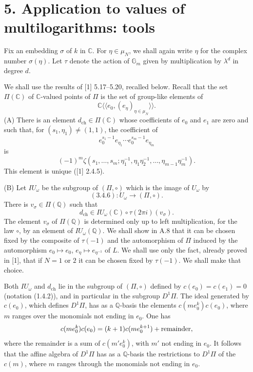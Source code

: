 \documentclass[10pt,a4paper]{article}
\newcommand{\Gm}{\mathbb G_m}
\newcommand{\Q}{\mathbb Q}
\newcommand{\C}{\mathbb C}
\theoremstyle{deligne}
\newcommand{\heading}[1]{\vspace{0.65em}\noindent{\bfseries #1}\quad}
\begin{document}
\section*{5. Application to values of multilogarithms: tools}

Fix an embedding \(\sigma\) of \(k\) in \(\C\). For \(\eta\in\mu_N\), we shall again write \(\eta\) for the complex number \(\sigma(\eta)\). Let \(\tau\) denote the action of \(\Gm\) given by multiplication by \(\lambda^d\) in degree \(d\).

\heading{5.1.} We shall use the results of [1] 5.17--5.20, recalled below. Recall that the set \(\Pi(\C)\) of \(\C\)-valued points of \(\Pi\) is the set of group-like elements of
\[
 \C\langle\!\langle e_0,(e_\eta)_{\eta\in\mu_N}\rangle\!\rangle .
\]
(A) There is an element \(d_{\mathrm{ch}}\in\Pi(\C)\) whose coefficients of \(e_0\) and \(e_1\) are zero and such that, for \((s_1,\eta_1)\ne(1,1)\), the coefficient of
\[
 e_0^{s_1-1}e_{\eta_1}\cdots e_0^{s_m-1}e_{\eta_m}
\]
is
\[
 (-1)^m\zeta(s_1,\ldots,s_m;\eta_1^{-1},\eta_1\eta_2^{-1},\ldots,\eta_{m-1}\eta_m^{-1}).
\]
This element is unique ([1] 2.4.5).

(B) Let \(IU_\omega\) be the subgroup of \((\Pi,\circ)\) which is the image of \(U_\omega\) by
\[
(3.4.6):U_\omega\longrightarrow(\Pi,\circ).
\]
There is \(v_\sigma\in\Pi(\Q)\) such that
\[
\tag{5.1.1}
d_{\mathrm{ch}}\in IU_\omega(\C)\circ \tau(2\pi i)(v_\sigma).
\]
The element \(v_\sigma\) of \(\Pi(\Q)\) is determined only up to left multiplication, for the law \(\circ\), by an element of \(IU_\omega(\Q)\). We shall show in A.8 that it can be chosen fixed by the composite of \(\tau(-1)\) and the automorphism of \(\Pi\) induced by the automorphism \(e_0\mapsto e_0\), \(e_\eta\mapsto e_{\eta^{-1}}\) of \(L\). We shall use only the fact, already proved in [1], that if \(N=1\) or \(2\) it can be chosen fixed by \(\tau(-1)\). We shall make that choice.

\heading{5.2.} Both \(IU_\omega\) and \(d_{\mathrm{ch}}\) lie in the subgroup of \((\Pi,\circ)\) defined by \(c(e_0)=c(e_1)=0\) (notation (1.4.2)), and in particular in the subgroup \(D^1\Pi\). The ideal generated by \(c(e_0)\), which defines \(D^1\Pi\), has as a \(\Q\)-basis the elements \(c(me_0^k)c(e_0)\), where \(m\) ranges over the monomials not ending in \(e_0\). One has
\[
c(me_0^k)c(e_0)=(k+1)c(me_0^{k+1})+\hbox{remainder},
\]
where the remainder is a sum of \(c(m'e_0^k)\), with \(m'\) not ending in \(e_0\). It follows that the affine algebra of \(D^1\Pi\) has as a \(\Q\)-basis the restrictions to \(D^1\Pi\) of the \(c(m)\), where \(m\) ranges through the monomials not ending in \(e_0\).
\end{document}

